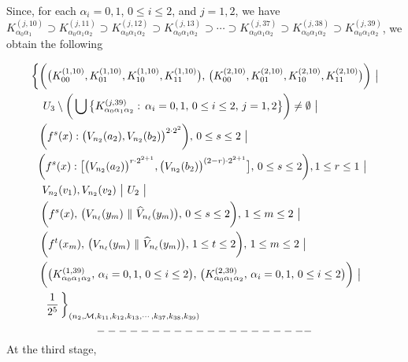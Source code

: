 \documentclass[12pt]{article}
\newcommand{\al}{\alpha}
\begin{document}
\vspace{.3in}

\indent Since, for each $\al_i = 0, 1$, $0 \le i \le 2$, and $j = 1, 2$, we have $K_{\al_0\al_1}^{(j,10)} \supset K_{\al_0\al_1\al_2}^{(j,11)} \supset K_{\al_0\al_1\al_2}^{(j,12)} \supset K_{\al_0\al_1\al_2}^{(j,13)} \supset \cdots \supset K_{\al_0\al_1\al_2}^{(j,37)} \supset K_{\al_0\al_1\al_2}^{(j,38)} \supset K_{\al_0\al_1\al_2}^{(j,39)}$, we obtain the following  

\begin{multline*}
$$
\bigg\{ \bigg(\big(K_{00}^{(1,10)}, K_{01}^{(1,10)}, K_{10}^{(1,10)}, K_{11}^{(1,10)}\big), \, \big(K_{00}^{(2,10)}, K_{01}^{(2,10)}, K_{10}^{(2,10)}, K_{11}^{(2,10)}\big)\bigg) \,\, \big| \\ 
U_3 \setminus \bigg( \bigcup \big\{ K_{\al_0\al_1\al_2}^{(j,39)}: \, \al_i = 0, 1, \, 0 \le i \le 2, \, j = 1, 2 \big\} \bigg) \ne \emptyset \,\, \big| \qquad\quad\,\,\,\,\,\,\,\,\, \\ 
\quad\qquad \bigg(f^s(x) : \big(V_{n_2}(a_2), V_{n_2}(b_2)\big)^{2 \cdot 2^2}\bigg), \, 0 \le s \le 2 \,\, \big| \qquad\qquad\qquad\qquad\qquad\qquad\quad\quad\,\, \\
\bigg(f^s(x) : \big[\big(V_{n_2}(a_2)\big)^{r \cdot 2^{2+1}}, \big(V_{n_2}(b_2)\big)^{(2-r) \cdot 2^{2+1}}\big], \, 0 \le s \le 2\bigg), 1 \le r \le 1 \,\, \big| \,\,\, \\
V_{n_2}(v_1), V_{n_2}(v_2) \,\, \big| \,\, U_2 \,\, \big|  \qquad\qquad\qquad\qquad\qquad\qquad\qquad\qquad\qquad\quad\quad\,\,\, \\ 
\bigg(f^{s}(x), \, \big(V_{n_\ell}(y_m) \,\, \| \,\, \widehat V_{n_\ell}(y_m)\big), \, 0 \le s \le 2\bigg), \, 1 \le m \le 2 \,\, \big| \qquad\qquad\qquad\,\, \\ 
\bigg(f^t(x_m), \, \big(V_{n_\ell}(y_m) \,\, \| \,\, \widehat V_{n_\ell}(y_m)\big), \, 1 \le t \le 2 \bigg), \, 1 \le m \le 2 \,\, \big| \qquad\quad\quad\quad\,\,\,\,\, \\
\,\, \bigg(\big(K_{\al_0\al_1\al_2}^{(1,39)}, \, \al_i = 0,1, \, 0 \le i \le 2\big), \, \big(K_{\al_0\al_1\al_2}^{(2,39)}, \, \al_i = 0, 1, \, 0 \le i \le 2\big)\bigg) \,\, \big| \quad\, \\
\,\, \frac 1{2^5} \, \bigg\}_{(n_2,\mathcal M,k_{11},k_{12},k_{13}, \cdots, k_{37},k_{38},k_{39})} \qquad\qquad\qquad\qquad\qquad\qquad\qquad\quad\,\,\,
$$
\end{multline*}
$$--------------------\vspace{.1in}$$
\indent At the third stage, 
\end{document}
